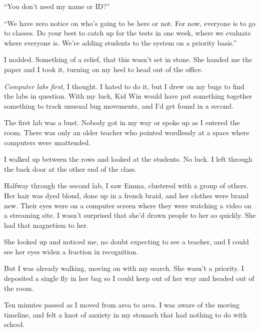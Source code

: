 ``You don't need my name or ID?''



``We have zero notice on who's going to be here or not.  For now, everyone is to go to classes.  Do your best to catch up for the tests in one week, where we evaluate where everyone is.  We're adding students to the system on a priority basis.''



I nodded.  Something of a relief, that this wasn't set in stone.  She handed me the paper and I took it, turning on my heel to head out of the office.



\emph{Computer labs first}, I thought.  I hated to do it, but I drew on my bugs to find the labs in question.  With my luck, Kid Win would have put something together something to track unusual bug movements, and I'd get found in a second.



The first lab was a bust.  Nobody got in my way or spoke up as I entered the room.  There was only an older teacher who pointed wordlessly at a space where computers were unattended.



I walked up between the rows and looked at the students.  No luck.  I left through the back door at the other end of the class.



Halfway through the second lab, I saw Emma, clustered with a group of others.  Her hair was dyed blond, done up in a french braid, and her clothes were brand new.  Their eyes were on a computer screen where they were watching a video on a streaming site.  I wasn't surprised that she'd drawn people to her so quickly.  She had that magnetism to her.



She looked up and noticed me, no doubt expecting to see a teacher, and I could see her eyes widen a fraction in recognition.



But I was already walking, moving on with my search.  She wasn't a priority.  I deposited a single fly in her bag so I could keep out of her way and headed out of the room.



Ten minutes passed as I moved from area to area.  I was aware of the moving timeline, and felt a knot of anxiety in my stomach that had nothing to do with school.




